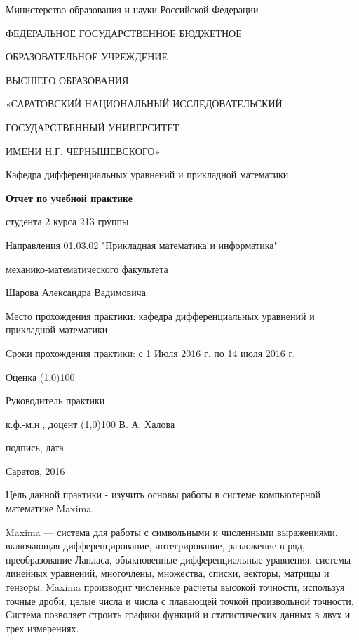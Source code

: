 \documentclass[article, bachelor, och, pract]{SCWorks}
\newcommand{\toCenter}[1]{\begin{center}#1\par\end{center}}
\newcommand{\toLeft}[1]{\begin{flushleft}#1\par\end{flushleft}}
\begin{document}
\thispagestyle{empty} 
\centerline{Министерство образования и науки Российской Федерации} 
\centerline{ФЕДЕРАЛЬНОЕ ГОСУДАРСТВЕННОЕ БЮДЖЕТНОЕ}
\centerline{ОБРАЗОВАТЕЛЬНОЕ УЧРЕЖДЕНИЕ} 
\centerline{ВЫСШЕГО ОБРАЗОВАНИЯ}
\centerline{«САРАТОВСКИЙ НАЦИОНАЛЬНЫЙ ИССЛЕДОВАТЕЛЬСКИЙ} 
\centerline{ГОСУДАРСТВЕННЫЙ УНИВЕРСИТЕТ}
\centerline{ИМЕНИ Н.Г. ЧЕРНЫШЕВСКОГО»}
\medskip%
\toLeft{Кафедра дифференциальных уравнений и прикладной математики}

\begin{center}%
\textbf{Отчет по учебной практике}
\medskip
\end{center}

\toLeft{студента 2 курса 213 группы}
\toLeft{Направления 01.03.02 "Прикладная математика и информатика"}
\toLeft{механико-математического факультета}
\toLeft{Шарова Александра Вадимовича}
\medskip


\toLeft{Место прохождения практики: кафедра дифференциальных уравнений и прикладной математики}
\bigskip

\toLeft{Сроки прохождения практики: с 1 Июля 2016 г. по 14 июля 2016 г. }
\vspace{1cm}

\toLeft{Оценка \line(1,0){100}

\vspace{1cm}

Руководитель практики

к.ф.-м.н., доцент \hspace{2.6cm} \line(1,0){100} \hspace{1.5cm} В. А. Халова

\hspace{6.8cm}подпись, дата
\bigskip

}

\vfill%
\vfill%
\toCenter{Саратов, 2016}

\setcounter{tocdepth}{1}

\tableofcontents
\intro


Цель данной практики - изучить основы работы в системе компьютерной математике Maxima. 

Maxima — система для работы с символьными и численными выражениями, включающая дифференцирование, интегрирование, разложение в ряд, преобразование Лапласа, обыкновенные дифференциальные уравнения, системы линейных уравнений, многочлены, множества, списки, векторы, матрицы и тензоры. Maxima производит численные расчеты высокой точности, используя точные дроби, целые числа и числа с плавающей точкой произвольной точности. Система позволяет строить графики функций и статистических данных в двух и трех измерениях.
\end{document}
